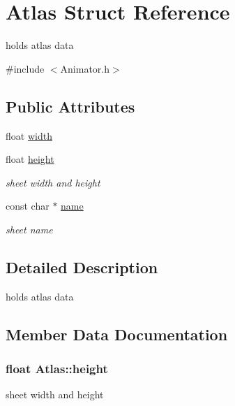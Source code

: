 \hypertarget{struct_atlas}{}\section{Atlas Struct Reference}
\label{struct_atlas}


holds atlas data  




{\ttfamily \#include $<$Animator.\+h$>$}

\subsection*{Public Attributes}
\begin{DoxyCompactItemize}
\item 
float \hyperlink{struct_atlas_a36a6e8a95974a952eda85a38e30eb50d}{width}
\item 
float \hyperlink{struct_atlas_a53097bd6f075c24a7e16bf17731715c7}{height}
\begin{DoxyCompactList}\small\item\em sheet width and height \end{DoxyCompactList}\item 
const char $\ast$ \hyperlink{struct_atlas_aaf174bab6442ce9047719a2c55486f17}{name}
\begin{DoxyCompactList}\small\item\em sheet name \end{DoxyCompactList}\end{DoxyCompactItemize}


\subsection{Detailed Description}
holds atlas data 

\subsection{Member Data Documentation}
\hypertarget{struct_atlas_a53097bd6f075c24a7e16bf17731715c7}{}
\subsubsection[{height}]{\setlength{\rightskip}{0pt plus 5cm}float Atlas\+::height}\label{struct_atlas_a53097bd6f075c24a7e16bf17731715c7}


sheet width and height 

